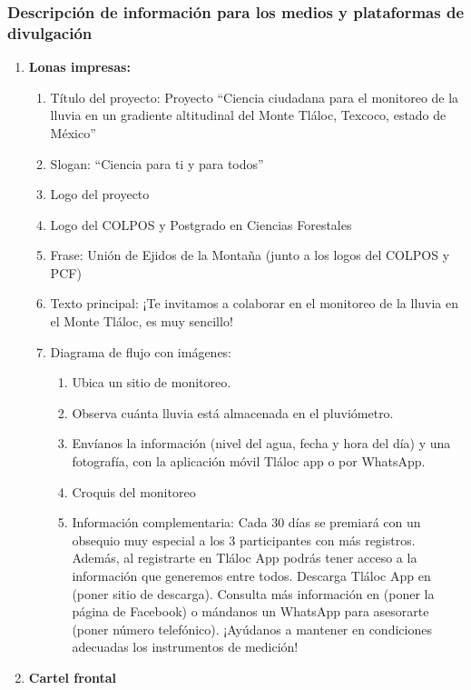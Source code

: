 \subsubsection*{Descripción de información para los medios y plataformas de divulgación}

\begin{enumerate}
    \item \textbf{Lonas impresas:}
    \begin{enumerate}
        \item Título del proyecto:
        Proyecto ``Ciencia ciudadana para el monitoreo de la lluvia en un gradiente altitudinal del Monte Tláloc, Texcoco, estado de México”
        \item	Slogan: 
        ``Ciencia para ti y para todos''
        \item Logo del proyecto
        \item Logo del COLPOS y Postgrado en Ciencias Forestales
        \item Frase: Unión de Ejidos de la Montaña (junto a los logos del COLPOS y PCF)
        \item Texto principal: ¡Te invitamos a colaborar en el monitoreo de la lluvia en el Monte Tláloc, es muy sencillo!
        \item Diagrama de flujo con imágenes: \begin{enumerate}
            \item Ubica un sitio de monitoreo.
            \item Observa cuánta lluvia está almacenada en el pluviómetro.
            \item Envíanos la información (nivel del agua, fecha y hora del día) y una fotografía, con la aplicación móvil Tláloc app o por WhatsApp.
            \item Croquis del monitoreo
            \item Información complementaria: Cada 30 días se premiará con un obsequio muy especial a los 3 participantes con más registros. Además, al            registrarte en Tláloc App podrás tener acceso a la información que            generemos entre todos. Descarga Tláloc App en (poner sitio de descarga). Consulta más información en (poner la página de Facebook) o mándanos un WhatsApp para asesorarte (poner número telefónico). ¡Ayúdanos a mantener en condiciones adecuadas los instrumentos de
            medición!
        \end{enumerate}
    \end{enumerate}
    \item \textbf{Cartel frontal} \begin{enumerate}

\end{enumerate}
\end{enumerate}
